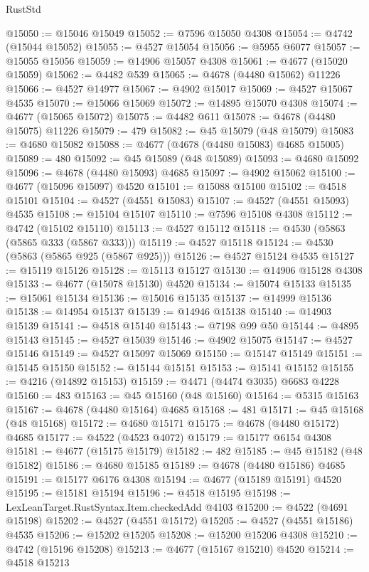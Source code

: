 \begin{lexlean}{RustStd}
\begin{coremodule}
@15050 := @15046 @15049
@15052 := @7596 @15050 @4308
@15054 := @4742 (@15044 @15052)
@15055 := @4527 @15054
@15056 := @5955 @6077
@15057 := @15055 @15056
@15059 := @14906 @15057 @4308
@15061 := @4677 (@15020 @15059)
@15062 := @4482 @539
@15065 := @4678 (@4480 @15062) @11226
@15066 := @4527 @14977
@15067 := @4902 @15017
@15069 := @4527 @15067 @4535
@15070 := @15066 @15069
@15072 := @14895 @15070 @4308
@15074 := @4677 (@15065 @15072)
@15075 := @4482 @611
@15078 := @4678 (@4480 @15075) @11226
@15079 := 479
@15082 := @45 @15079 (@48 @15079)
@15083 := @4680 @15082
@15088 := @4677 (@4678 (@4480 @15083) @4685 @15005)
@15089 := 480
@15092 := @45 @15089 (@48 @15089)
@15093 := @4680 @15092
@15096 := @4678 (@4480 @15093) @4685
@15097 := @4902 @15062
@15100 := @4677 (@15096 @15097) @4520
@15101 := @15088 @15100
@15102 := @4518 @15101
@15104 := @4527 (@4551 @15083)
@15107 := @4527 (@4551 @15093) @4535
@15108 := @15104 @15107
@15110 := @7596 @15108 @4308
@15112 := @4742 (@15102 @15110)
@15113 := @4527 @15112
@15118 := @4530 (@5863 (@5865 @333 (@5867 @333)))
@15119 := @4527 @15118
@15124 := @4530 (@5863 (@5865 @925 (@5867 @925)))
@15126 := @4527 @15124 @4535
@15127 := @15119 @15126
@15128 := @15113 @15127
@15130 := @14906 @15128 @4308
@15133 := @4677 (@15078 @15130) @4520
@15134 := @15074 @15133
@15135 := @15061 @15134
@15136 := @15016 @15135
@15137 := @14999 @15136
@15138 := @14954 @15137
@15139 := @14946 @15138
@15140 := @14903 @15139
@15141 := @4518 @15140
@15143 := @7198 @99 @50
@15144 := @4895 @15143
@15145 := @4527 @15039
@15146 := @4902 @15075
@15147 := @4527 @15146
@15149 := @4527 @15097 @15069
@15150 := @15147 @15149
@15151 := @15145 @15150
@15152 := @15144 @15151
@15153 := @15141 @15152
@15155 := @4216 (@14892 @15153)
@15159 := @4471 (@4474 @3035) @6683 @4228
@15160 := 483
@15163 := @45 @15160 (@48 @15160)
@15164 := @5315 @15163
@15167 := @4678 (@4480 @15164) @4685
@15168 := 481
@15171 := @45 @15168 (@48 @15168)
@15172 := @4680 @15171
@15175 := @4678 (@4480 @15172) @4685
@15177 := @4522 (@4523 @4072)
@15179 := @15177 @6154 @4308
@15181 := @4677 (@15175 @15179)
@15182 := 482
@15185 := @45 @15182 (@48 @15182)
@15186 := @4680 @15185
@15189 := @4678 (@4480 @15186) @4685
@15191 := @15177 @6176 @4308
@15194 := @4677 (@15189 @15191) @4520
@15195 := @15181 @15194
@15196 := @4518 @15195
@15198 := LexLeanTarget.RustSyntax.Item.checkedAdd @4103
@15200 := @4522 (@4691 @15198)
@15202 := @4527 (@4551 @15172)
@15205 := @4527 (@4551 @15186) @4535
@15206 := @15202 @15205
@15208 := @15200 @15206 @4308
@15210 := @4742 (@15196 @15208)
@15213 := @4677 (@15167 @15210) @4520
@15214 := @4518 @15213

\end{coremodule}
\end{lexlean}
